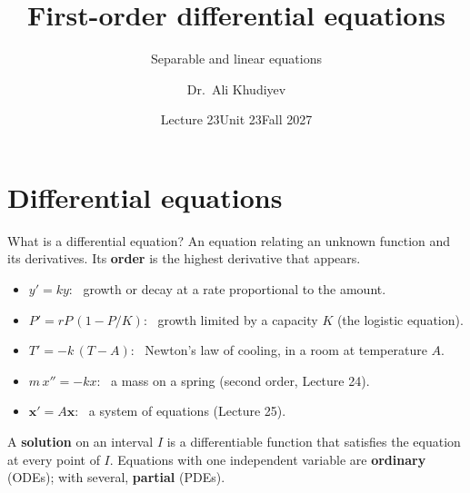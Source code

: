 \documentclass[10pt]{wosm-slides}
\title[L23 \textperiodcentered\ First-order differential equations]{First-order differential equations}
\subtitle{Separable and linear equations}
\author{Dr.\ Ali Khudiyev}
\institute{WoSM Academy}
\date{Lecture 23\enspace\textperiodcentered\enspace Unit 23\enspace\textperiodcentered\enspace Fall 2027}
\begin{document}
\maketitle



\section{Differential equations}

\begin{frame}{What is a differential equation?}
  An equation relating an unknown function and its derivatives. Its \textbf{order} is the highest
  derivative that appears.
  \pause
  \begin{itemize}
    \item $y' = ky$: \ growth or decay at a rate proportional to the amount.
    \item $P' = rP\,(1 - P/K)$: \ growth limited by a capacity $K$ (the logistic equation).
    \item $T' = -k\,(T - A)$: \ Newton's law of cooling, in a room at temperature $A$.
    \item $m\,x'' = -kx$: \ a mass on a spring (second order, Lecture 24).
    \item $\mathbf x' = A\mathbf x$: \ a system of equations (Lecture 25).
  \end{itemize}
  \pause
  A \textbf{solution} on an interval $I$ is a differentiable function that satisfies the equation at
  every point of $I$. Equations with one independent variable are \textbf{ordinary} (ODEs); with
  several, \textbf{partial} (PDEs).
\end{frame}
\end{document}
